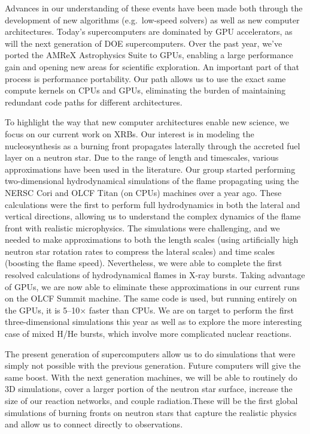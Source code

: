 \documentclass[11pt]{article}
\begin{document}
Advances in our understanding of these events have been made both
through the development of new algorithms (e.g.\ low-speed solvers) as
well as new computer architectures.  Today's supercomputers are
dominated by GPU accelerators, as will the next generation of
DOE supercomputers.  Over the past year,
we've ported the AMReX Astrophysics Suite to GPUs, enabling a large
performance gain and opening new areas for scientific exploration.  An
important part of that process is performance portability.  Our path
allows us to use the exact same compute kernels on CPUs and GPUs,
eliminating the burden of maintaining redundant code paths for
different architectures.

To highlight the way that new computer architectures enable new
science, we focus on our current work on XRBs.  Our interest is in
modeling the nucleosynthesis as a burning front propagates laterally
through the accreted fuel layer on a neutron star.  Due to the range
of length and timescales, various approximations have been used in the
literature.  Our group started performing two-dimensional
hydrodynamical simulations of the flame propagating using the NERSC
Cori and OLCF Titan (on CPUs)  machines over a year ago.  These calculations were
the first to perform full hydrodynamics in both the lateral and
vertical directions, allowing us to understand the complex dynamics of
the flame front with realistic microphysics.  The simulations were
challenging, and we needed to make approximations to both the length
scales (using artificially high neutron star rotation rates to compress
the lateral scales) and time scales (boosting the flame speed).
Nevertheless, we were able to complete the first resolved calculations
of hydrodynamical flames in X-ray bursts.  Taking advantage of GPUs,
we are now able to eliminate these approximations in our current runs on the
OLCF Summit machine.  The same code is used,
but running entirely on the GPUs, it is 5--10$\times$ faster than
CPUs.  We are on target to perform the first three-dimensional
simulations this year as well as to explore the more interesting case
of mixed H/He bursts, which involve more complicated nuclear
reactions.

The present generation of supercomputers allow us to do simulations
that were simply not possible with the previous generation.  Future
computers will give the same boost.  With the next generation
machines, we will be able to routinely do 3D simulations, cover a
larger portion of the neutron star surface, increase the size of our
reaction networks, and couple radiation.These will be the first global
simulations of burning fronts on neutron stars that capture the
realistic physics and allow us to connect directly to observations.
\end{document}
